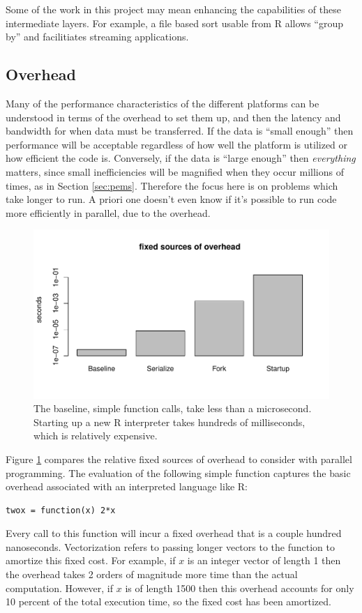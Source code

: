 \documentclass[12pt]{article}
\begin{document}
Some of the work in this project may mean enhancing the capabilities of these
intermediate layers. For example, a file based sort usable from R allows
``group by'' and facilitiates streaming applications.

\subsection{Overhead}

Many of the performance characteristics of the different platforms can be
understood in terms of the overhead to set them up, and then the latency
and bandwidth for when data must be transferred.  If the data is ``small
enough'' then performance will be acceptable regardless of how well the
platform is utilized or how efficient the code is. Conversely, if the data
is ``large enough'' then \emph{everything} matters, since small
inefficiencies will be magnified when they occur millions of times, as in
Section \ref{sec:pems}.  Therefore the focus here is on problems which take longer
to run. A priori one doesn't even know if it's possible to run code more
efficiently in parallel, due to the overhead.

\begin{figure}
\centering
\includegraphics[width=.8\linewidth]{compute_times/overhead}
\caption{The baseline, simple function calls, take less than a microsecond. Starting up a
    new R interpreter takes hundreds of milliseconds, which is relatively expensive.}
\label{fig:overhead}
\end{figure}

Figure \ref{fig:overhead} compares the relative fixed sources of overhead to
consider with parallel programming. The evaluation of the following simple
function captures the basic overhead associated with an interpreted
language like R:
\begin{verbatim}
twox = function(x) 2*x
\end{verbatim}
Every call to this function will incur a fixed overhead that is a couple
hundred nanoseconds. Vectorization refers to passing longer vectors to the
function to amortize this fixed cost. For example, if $x$ is an integer
vector of length 1 then the overhead takes 2 orders of magnitude more time
than the actual computation. However, if $x$ is of length 1500 then this
overhead accounts for only 10 percent of the total execution time, so the
fixed cost has been amortized.
\end{document}
